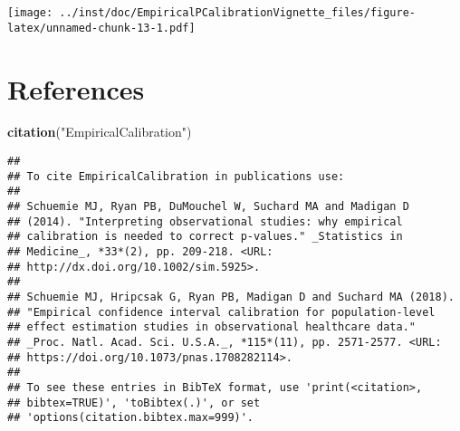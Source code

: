 \documentclass[]{article}
\newenvironment{Shaded}{\begin{snugshade}}{\end{snugshade}}
\newcommand{\KeywordTok}[1]{\textcolor[rgb]{0.13,0.29,0.53}{\textbf{#1}}}
\newcommand{\NormalTok}[1]{#1}
\newcommand{\StringTok}[1]{\textcolor[rgb]{0.31,0.60,0.02}{#1}}
\begin{document}
\texttt{[image: ../inst/doc/EmpiricalPCalibrationVignette\_files/figure-latex/unnamed-chunk-13-1.pdf]}

\hypertarget{references}{%
\section{References}\label{references}}

\begin{Shaded}
\begin{Highlighting}[]
\KeywordTok{citation}\NormalTok{(}\StringTok{"EmpiricalCalibration"}\NormalTok{)}
\end{Highlighting}
\end{Shaded}

\begin{verbatim}
## 
## To cite EmpiricalCalibration in publications use:
## 
## Schuemie MJ, Ryan PB, DuMouchel W, Suchard MA and Madigan D
## (2014). "Interpreting observational studies: why empirical
## calibration is needed to correct p-values." _Statistics in
## Medicine_, *33*(2), pp. 209-218. <URL:
## http://dx.doi.org/10.1002/sim.5925>.
## 
## Schuemie MJ, Hripcsak G, Ryan PB, Madigan D and Suchard MA (2018).
## "Empirical confidence interval calibration for population-level
## effect estimation studies in observational healthcare data."
## _Proc. Natl. Acad. Sci. U.S.A._, *115*(11), pp. 2571-2577. <URL:
## https://doi.org/10.1073/pnas.1708282114>.
## 
## To see these entries in BibTeX format, use 'print(<citation>,
## bibtex=TRUE)', 'toBibtex(.)', or set
## 'options(citation.bibtex.max=999)'.
\end{verbatim}
\end{document}
